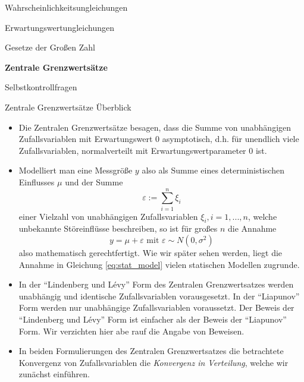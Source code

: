 \documentclass[
  8pt,
  ignorenonframetext,
]{beamer}
\providecommand{\tightlist}{%
  \setlength{\itemsep}{0pt}\setlength{\parskip}{0pt}}
\begin{document}
\begin{frame}{}
\protect\hypertarget{section-6}{}
\large
\vfill
{}

Wahrscheinlichkeitsungleichungen

Erwartungswertungleichungen

Gesetze der Großen Zahl

\textbf{Zentrale Grenzwertsätze}

Selbstkontrollfragen \vfill
\end{frame}

\begin{frame}{Zentrale Grenzwertsätze}
\protect\hypertarget{zentrale-grenzwertsuxe4tze}{}
Überblick \footnotesize

\begin{itemize}
\tightlist
\item
  \justifying Die Zentralen Grenzwertsätze besagen, dass die Summe von
  unabhängigen Zufallsvariablen mit Erwartungswert 0 asymptotisch, d.h.
  für unendlich viele Zufallsvariablen, normalverteilt mit
  Erwartungswertparameter 0 ist.
\item
  Modelliert man eine Messgröße \(y\) also als Summe eines
  deterministischen Einflusses \(\mu\) und der Summe \begin{equation}
  \varepsilon := \sum_{i=1}^n \xi_i
  \end{equation} einer Vielzahl von unabhängigen Zufallsvariablen
  \(\xi_i, i = 1,...,n\), welche unbekannte Störeinflüsse beschreiben,
  so ist für großes \(n\) die Annahme
  \begin{equation}\label{eq:stat_model}
  y = \mu + \varepsilon \mbox{ mit } \varepsilon \sim N(0,\sigma^2)
  \end{equation} also mathematisch gerechtfertigt. Wie wir später sehen
  werden, liegt die Annahme in Gleichung \eqref{eq:stat_model} vielen
  statischen Modellen zugrunde.
\item
  In der ``Lindenberg und Lévy'' Form des Zentralen Grenzwertsatzes
  werden unabhängig und identische Zufallsvariablen vorausgesetzt. In
  der ``Liapunov'' Form werden nur unabhängige Zufallsvariablen
  voraussetzt. Der Beweis der ``Lindenberg und Lévy'' Form ist einfacher
  als der Beweis der ``Liapunov'' Form. Wir verzichten hier abe rauf die
  Angabe von Beweisen.
\item
  In beiden Formulierungen des Zentralen Grenzwertsatzes die betrachtete
  Konvergenz von Zufallsvariablen die \emph{Konvergenz in Verteilung},
  welche wir zunächst einführen.
\end{itemize}
\end{frame}
\end{document}
